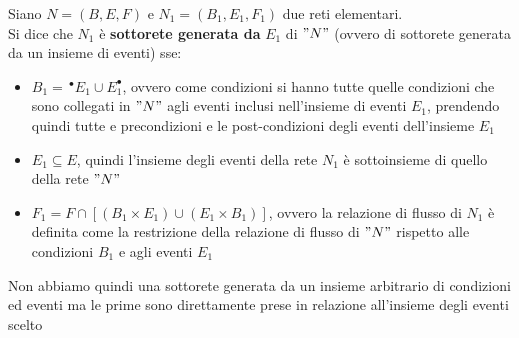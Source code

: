 \begin{definizione}
  Siano $N=(B, E, F)$ e $N_1=(B_1, E_1, F_1)$ due reti elementari.\\
  Si dice che $N_1$ è \textbf{sottorete generata da} $E_1$ di $"N"$ (ovvero di
  sottorete generata da un insieme di eventi) sse:
  \begin{itemize}
    \item $B_1=\,^\bullet E_1\cup E_1^\bullet$, ovvero come condizioni si
    hanno tutte quelle condizioni che sono collegati in $"N"$ agli eventi inclusi
    nell'insieme di eventi $E_1$, prendendo quindi tutte e precondizioni e le
    post-condizioni degli eventi dell'insieme $E_1$
    \item $E_1\subseteq E$, quindi l'insieme degli eventi della rete $N_1$
    è sottoinsieme di quello della rete $"N"$
    \item $F_1=F\cap[(B_1\times E_1)\cup (E_1\times B_1)]$, ovvero la relazione
    di flusso di $N_1$ è definita come la restrizione della relazione di flusso
    di $"N"$ rispetto alle condizioni $B_1$ e agli eventi $E_1$
  \end{itemize}
  Non abbiamo quindi una sottorete generata da un insieme arbitrario di condizioni ed
  eventi ma le prime sono direttamente prese in relazione all'insieme degli
  eventi scelto
\end{definizione} \vspace{5mm} %
